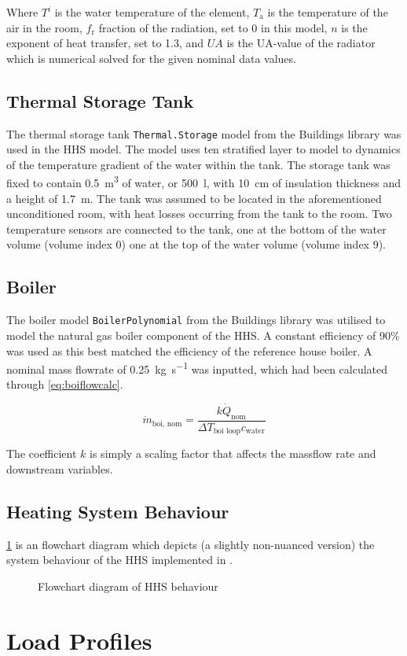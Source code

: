Where $T^i$ is the water temperature of the element, $T_\text{a}$ is the temperature of the air in the room, $f_\text{r}$ fraction of the radiation, set to 0 in this model, $n$ is the exponent of heat transfer, set to 1.3, and $UA$ is the UA-value of the radiator which is numerical solved for the given nominal data values. 

\subsection{Thermal Storage Tank}
The thermal storage tank \texttt{Thermal.Storage} model from the Buildings library \cite{wetter_modelica_2014} was used in the \ac{HHS} model. The model uses ten stratified layer to model to dynamics of the temperature gradient of the water within the tank. The storage tank was fixed to contain \qty{0.5}{\cubic\meter} of water, or \qty{500}{\litre}, with \qty{10}{\centi\meter} of insulation thickness and a height of \qty{1.7}{\meter}. The tank was assumed to be located in the aforementioned unconditioned room, with heat losses occurring from the tank to the room. Two temperature sensors are connected to the tank, one at the bottom of the water volume (volume index 0) one at the top of the water volume (volume index 9). 

\subsection{Boiler}
The boiler model \texttt{BoilerPolynomial} from the Buildings library was utilised to model the natural gas boiler component of the \ac{HHS}. A constant efficiency of 90\% was used as this best matched the efficiency of the reference house boiler. A nominal mass flowrate of \qty{0.25}{\kilo\gram\per\second} was inputted, which had been calculated through \cref{eq:boiflowcalc}.

\begin{equation}
    \dot{m}_\text{boi, nom} = \frac{k\dot{Q}_\text{nom}}{\Delta T_\text{boi loop}  c_\text{water}} \label{eq:boiflowcalc}
\end{equation}

The coefficient $k$ is simply a scaling factor that affects the massflow rate and downstream variables.

\subsection{Heating System Behaviour}
\cref{fig:hhsflowchart} is an flowchart diagram which depicts (a slightly non-nuanced version) the system behaviour of the \ac{HHS} implemented in \modelica. 
\begin{figure}[htb]
    \centering
    
    
    \caption{Flowchart diagram of \acs{HHS} behaviour}
    \label{fig:hhsflowchart}
\end{figure}
\section{Load Profiles}